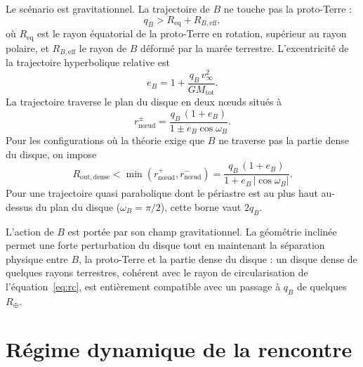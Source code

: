 \documentclass[11pt,a4paper,openany]{report}
\newcommand{\Rt}{R_{\oplus}}
\newcommand{\Req}{R_{\mathrm{eq}}}
\newcommand{\Mtot}{M_{\mathrm{tot}}}
\begin{document}
Le scénario est gravitationnel. La trajectoire de $B$ ne touche pas la proto-Terre :
\begin{equation}
q_B>\Req+R_{B,\mathrm{eff}},
\label{eq:nc}
\end{equation}
où $\Req$ est le rayon équatorial de la proto-Terre en rotation, supérieur au rayon polaire, et
$R_{B,\mathrm{eff}}$ le rayon de $B$ déformé par la marée terrestre. L'excentricité de la
trajectoire hyperbolique relative est
\begin{equation}
e_B=1+\frac{q_B\,v_\infty^2}{G\Mtot}.
\label{eq:eB}
\end{equation}
La trajectoire traverse le plan du disque en deux nœuds situés à
\begin{equation}
r_{\text{nœud}}^{\pm}=\frac{q_B\,(1+e_B)}{1\pm e_B\cos\omega_B}.
\label{eq:noeuds}
\end{equation}
Pour les configurations où la théorie exige que $B$ ne traverse pas la partie dense du disque,
on impose
\begin{equation}
R_{\mathrm{out,dense}}<\min\left(r_{\text{nœud}}^{+},r_{\text{nœud}}^{-}\right)
=\frac{q_B\,(1+e_B)}{1+e_B\,|\cos\omega_B|}.
\label{eq:nontraversee}
\end{equation}
Pour une trajectoire quasi parabolique dont le périastre est au plus haut au-dessus du plan du
disque ($\omega_B=\pi/2$), cette borne vaut $2q_B$.

\begin{lecture}
L'action de $B$ est portée par son champ gravitationnel. La géométrie inclinée permet une forte
perturbation du disque tout en maintenant la séparation physique entre $B$, la proto-Terre et
la partie dense du disque : un disque dense de quelques rayons terrestres, cohérent avec le
rayon de circularisation de l'équation~\eqref{eq:rc}, est entièrement compatible avec un passage
à $q_B$ de quelques $\Rt$.
\end{lecture}

\section{Régime dynamique de la rencontre}
\end{document}
